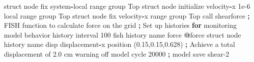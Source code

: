 \documentclass[a4paper, nobind]{templates/ociamthesis}
\newenvironment{Shaded}{\begin{snugshade}}{\end{snugshade}}
\newcommand{\BuiltInTok}[1]{#1}
\newcommand{\ControlFlowTok}[1]{\textcolor[rgb]{0.13,0.29,0.53}{\textbf{#1}}}
\newcommand{\DecValTok}[1]{\textcolor[rgb]{0.00,0.00,0.81}{#1}}
\newcommand{\FloatTok}[1]{\textcolor[rgb]{0.00,0.00,0.81}{#1}}
\newcommand{\NormalTok}[1]{#1}
\newcommand{\OperatorTok}[1]{\textcolor[rgb]{0.81,0.36,0.00}{\textbf{#1}}}
\newcommand{\StringTok}[1]{\textcolor[rgb]{0.31,0.60,0.02}{#1}}
\renewenvironment{Shaded}
{
  \vspace{10pt}%
  \begin{snugshade}%
}{%
  \end{snugshade}%
  \vspace{8pt}%
}
\newcommand*{\bibtitle}{Works Cited}
\begin{document}
\begin{Shaded}
\begin{Highlighting}[]
\NormalTok{    struct node fix system}\OperatorTok{{-}}\NormalTok{local }\BuiltInTok{range}\NormalTok{ group }\StringTok{\textquotesingle{}Top\textquotesingle{}}
\NormalTok{    struct node initialize velocity}\OperatorTok{{-}}\NormalTok{x }\FloatTok{1e{-}6}\NormalTok{ local }\BuiltInTok{range}\NormalTok{ group }\StringTok{\textquotesingle{}Top\textquotesingle{}}
\NormalTok{    struct node fix velocity}\OperatorTok{{-}}\NormalTok{x }\BuiltInTok{range}\NormalTok{ group }\StringTok{\textquotesingle{}Top\textquotesingle{}}
\NormalTok{    call }\StringTok{\textquotesingle{}shearforce\textquotesingle{}} \OperatorTok{;}\NormalTok{ FISH function to calculate force on the grid}
    \OperatorTok{;}\NormalTok{ Set up histories }\ControlFlowTok{for}\NormalTok{ monitoring model behavior}
\NormalTok{    history interval }\DecValTok{100}
\NormalTok{    fish history name }\StringTok{\textquotesingle{}force\textquotesingle{}} \OperatorTok{@}\NormalTok{force}
\NormalTok{    struct node history name }\StringTok{\textquotesingle{}disp\textquotesingle{}}\NormalTok{ displacement}\OperatorTok{{-}}\NormalTok{x position (}\FloatTok{0.15}\NormalTok{,}\FloatTok{0.15}\NormalTok{,}\FloatTok{0.628}\NormalTok{)}
    \OperatorTok{;}\NormalTok{ Achieve a total displacement of }\FloatTok{2.0}\NormalTok{ cm}
\NormalTok{    warning off}
\NormalTok{    model cycle }\DecValTok{20000}
    \OperatorTok{;}
\NormalTok{    model save }\StringTok{\textquotesingle{}shear{-}2\textquotesingle{}}
\end{Highlighting}
\end{Shaded}



\setlength{\baselineskip}{0pt} %

{\renewcommand*\MakeUppercase[1]{#1}%
\printbibliography[heading=bibintoc,title={\bibtitle}]}
\end{document}
